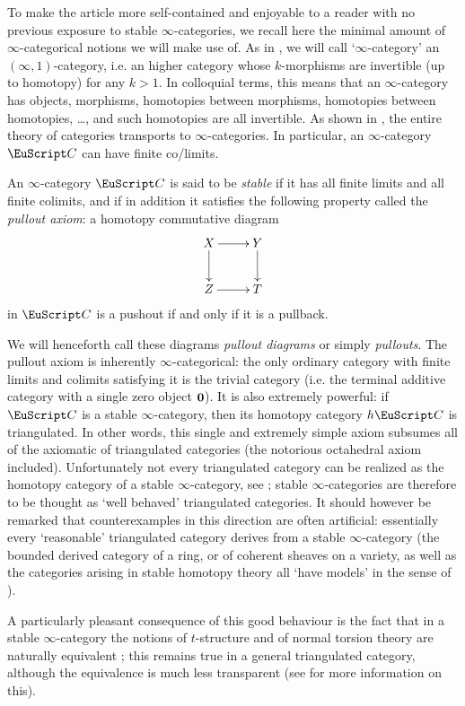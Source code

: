 {To make the article more self\hyp{}contained and enjoyable to a reader with no previous exposure to stable $\infty$-categories, we recall here the minimal amount of $\infty$-categorical notions we will make use of. As in \cite{HTT}, we will call `$\infty$-category' an $(\infty,1)$-category, i.e. an higher category whose $k$-morphisms are invertible (up to homotopy) for any $k>1$. In colloquial terms, this means that an $\infty$-category has objects, morphisms, homotopies between morphisms, homotopies between homotopies, \dots, and such homotopies are all invertible. As shown in \cite{HTT, Joyal2008}, the entire theory of categories transports to $\infty$-categories. In particular, an $\infty$-category $\C$ can have finite co/limits.
\begin{definition*}
An $\infty$-category $\C$ is said to be \emph{stable}  if it has all finite limits and all finite colimits, and if in addition it satisfies the following property called the \emph{pullout axiom}:
a homotopy commutative diagram
\[
\xymatrix{X\ar[r]\ar[d]&Y\ar[d]\\
Z\ar[r]&T
}
\]
in $\C$ is a pushout if and only if it is a pullback. 
\end{definition*}
We will henceforth call these diagrams \emph{pullout diagrams} or simply \emph{pullouts}.
The pullout axiom is inherently $\infty$-categorical: the only ordinary category with finite limits and colimits satisfying it is the trivial category (i.e. the terminal additive category with a single zero object $\bf 0$). It is also extremely powerful: if $\C$ is a stable $\infty$-category, then its homotopy category $h\C$ is triangulated. In other words, this single and extremely simple axiom subsumes all of the axiomatic of triangulated categories (the notorious octahedral axiom included). Unfortunately not every triangulated category can be realized as the homotopy category of a stable $\infty$-category, see \cite{MR2342636}; stable $\infty$-categories are therefore to be thought as `well behaved' triangulated categories. It should however be remarked that counterexamples in this direction are often artificial: essentially every `reasonable' triangulated category  derives from a stable $\infty$-category  (the bounded derived category of a ring, or of coherent sheaves on a variety, as well as the categories arising in stable homotopy theory all `have models'  in the sense of \cite{MR2342636}). 

A particularly pleasant consequence of this good behaviour is the fact that in a stable $\infty$-category the notions of $t$-structure and of normal torsion theory are naturally equivalent \cite{Fiorenza2014}; this remains true in a general triangulated category, although the equivalence is much less transparent (see \cite{tderiv} for more information on this). 

}
